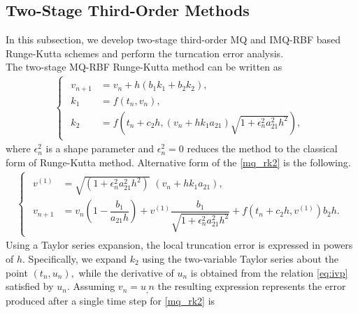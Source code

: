 \documentclass[a4paper, preprint,11pt]{elsarticle}
\numberwithin{equation}{section}
\begin{document}
\subsection{Two-Stage Third-Order Methods}
In this subsection, we develop two-stage third-order MQ and IMQ-RBF based Runge-Kutta schemes and perform the turncation error analysis.\\ \newline 
{} The two-stage MQ-RBF Runge-Kutta method can be written as
\begin{eqnarray}\label{mq_rk2}
\begin{cases}
\begin{aligned}
v_{n+1} &= v_n + h(b_1 k_1 + b_2 k_2),\\    
k_1 &= f(t_n, v_n), \\
k_2 &= f\left(t_n + c_2 h,(v_n + hk_1a_{21}) \sqrt{1 + \epsilon_n^2 a_{21}^2 h^2} \right) ,
\end{aligned}    
\end{cases}    
\end{eqnarray}
where $\epsilon_n^2$ is a shape parameter and $\epsilon_n^2 = 0$ reduces the method to the classical form of Runge-Kutta method. Alternative form of the \eqref{mq_rk2} is the following.
\begin{eqnarray*}
\begin{cases}
\begin{aligned}
v^{(1)} &= \sqrt{(1 + \epsilon_n^2 a_{21}^2 h^2)}\,\,(v_n + hk_1a_{21}),\\
v_{n+1} &= v_n\left( 1 - \dfrac{b_1}{a_{21}h}\right) 
    + v^{(1)} \dfrac{b_1 }{\sqrt{1 + \epsilon_n^2 a_{21}^2h^2}} + f(t_n + c_2 h, v^{(1)}) b_2 h.
\end{aligned}
\end{cases}
\end{eqnarray*}
Using a Taylor series expansion, the local truncation error is expressed in powers of  $h.$ Specifically, we expand  $k_2$ using the two-variable Taylor series about the point 
$(t_n, u_n),$ while the derivative of  $u_n$ is obtained from the relation \eqref{eq:ivp} satisfied by 
$u_n.$ Assuming $v_n=u_,n$ the resulting expression represents the error produced after a single time step for \eqref{mq_rk2} is
\end{document}
